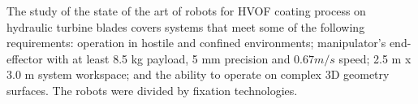 The study of the state of the art of robots for HVOF coating process on
hydraulic turbine blades covers systems that meet some of the following
requirements:
operation in hostile and confined environments; manipulator's end-effector with
at least 8.5 kg payload, 5 mm precision and $0.67 m/s$ speed; 2.5 m x 3.0 m
system workspace; and the ability to operate on complex 3D geometry surfaces.
The robots were divided by fixation technologies.


